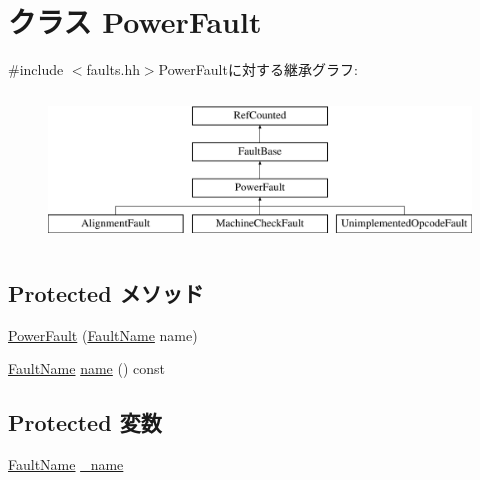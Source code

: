 \hypertarget{classPowerISA_1_1PowerFault}{
\section{クラス PowerFault}
\label{classPowerISA_1_1PowerFault}
}


{\ttfamily \#include $<$faults.hh$>$}PowerFaultに対する継承グラフ:\begin{figure}[H]
\begin{center}
\leavevmode
\includegraphics[height=4cm]{classPowerISA_1_1PowerFault}
\end{center}
\end{figure}
\subsection*{Protected メソッド}
\begin{DoxyCompactItemize}
\item 
\hyperlink{classPowerISA_1_1PowerFault_a8a353517c99bcdf649163417bfaa3288}{PowerFault} (\hyperlink{sim_2faults_8hh_abb196df64725e5c2568c900cf130d8d7}{FaultName} name)
\item 
\hyperlink{sim_2faults_8hh_abb196df64725e5c2568c900cf130d8d7}{FaultName} \hyperlink{classPowerISA_1_1PowerFault_a73adb23259baf912a81683a9790a303f}{name} () const 
\end{DoxyCompactItemize}
\subsection*{Protected 変数}
\begin{DoxyCompactItemize}
\item 
\hyperlink{sim_2faults_8hh_abb196df64725e5c2568c900cf130d8d7}{FaultName} \hyperlink{classPowerISA_1_1PowerFault_ac79073ffcd2c66a09bcd3bd3ad206019}{\_\-name}
\end{DoxyCompactItemize}


